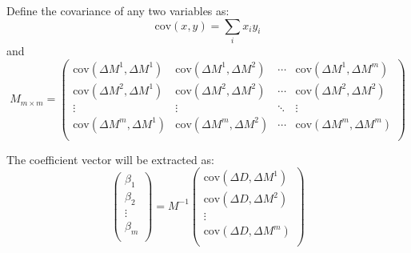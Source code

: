 Define the covariance of any two variables as:
\begin{equation}
    \text{cov}(x, y) = \sum_i x_i y_i
\end{equation}
and
\begin{equation}
    M_{m \times m} = 
    \begin{pmatrix}
	\text{cov}(\Delta M^1, \Delta M^1) & \text{cov}(\Delta M^1, \Delta M^2)   & \cdots & \text{cov}(\Delta M^1, \Delta M^m)  \\
	\text{cov}(\Delta M^2, \Delta M^1) & \text{cov}(\Delta M^2, \Delta M^2)   & \cdots & \text{cov}(\Delta M^2, \Delta M^2)  \\
	\vdots	& \vdots    & \ddots	& \vdots    \\
	\text{cov}(\Delta M^m, \Delta M^1) & \text{cov}(\Delta M^m, \Delta M^2)   & \cdots & \text{cov}(\Delta M^m, \Delta M^m)  \\
    \end{pmatrix}
\end{equation}

The coefficient vector will be extracted as:
\begin{equation}
    \begin{pmatrix}
	\beta_1 \\
	\beta_2 \\
	\vdots	\\
	\beta_m \\ 
    \end{pmatrix}
    =
    M^{-1}
    \begin{pmatrix}
	\text{cov}(\Delta D, \Delta M^1)   \\
	\text{cov}(\Delta D, \Delta M^2)   \\
	\vdots	\\
	\text{cov}(\Delta D, \Delta M^m)   \\
    \end{pmatrix}
\end{equation}

